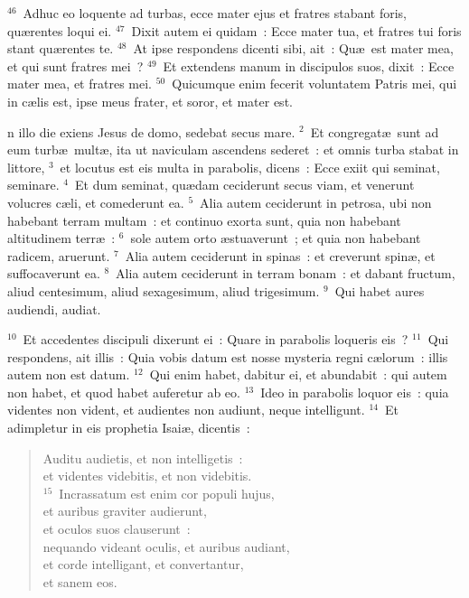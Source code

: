 ${}^{46}$~Adhuc eo loquente ad turbas, ecce mater ejus et fratres stabant foris, qu\ae rentes loqui ei.
${}^{47}$~Dixit autem ei quidam~: Ecce mater tua, et fratres tui foris stant qu\ae rentes te.
${}^{48}$~At ipse respondens dicenti sibi, ait~: Qu\ae\ est mater mea, et qui sunt fratres mei~?
${}^{49}$~Et extendens manum in discipulos suos, dixit~: Ecce mater mea, et fratres mei.
${}^{50}$~Quicumque enim fecerit voluntatem Patris mei, qui in c\ae lis est, ipse meus frater, et soror, et mater est.

\bchapter
{}n illo die exiens Jesus de domo, sedebat secus mare.
${}^{2}$~Et congregat\ae\ sunt ad eum turb\ae\ mult\ae , ita ut naviculam ascendens sederet~: et omnis turba stabat in littore,
${}^{3}$~et locutus est eis multa in parabolis, dicens~: Ecce exiit qui seminat, seminare.
${}^{4}$~Et dum seminat, qu\ae dam ceciderunt secus viam, et venerunt volucres c\ae li, et comederunt ea.
${}^{5}$~Alia autem ceciderunt in petrosa, ubi non habebant terram multam~: et continuo exorta sunt, quia non habebant altitudinem terr\ae~:
${}^{6}$~sole autem orto \ae stuaverunt~; et quia non habebant radicem, aruerunt.
${}^{7}$~Alia autem ceciderunt in spinas~: et creverunt spin\ae , et suffocaverunt ea.
${}^{8}$~Alia autem ceciderunt in terram bonam~: et dabant fructum, aliud centesimum, aliud sexagesimum, aliud trigesimum.
${}^{9}$~Qui habet aures audiendi, audiat.


${}^{10}$~Et accedentes discipuli dixerunt ei~: Quare in parabolis loqueris eis~?
${}^{11}$~Qui respondens, ait illis~: Quia vobis datum est nosse mysteria regni c\ae lorum~: illis autem non est datum.
${}^{12}$~Qui enim habet, dabitur ei, et abundabit~: qui autem non habet, et quod habet auferetur ab eo.
${}^{13}$~Ideo in parabolis loquor eis~: quia videntes non vident, et audientes non audiunt, neque intelligunt.
${}^{14}$~Et adimpletur in eis prophetia Isai\ae , dicentis~: \begin{verse}Auditu audietis, et non intelligetis~:\\ et videntes videbitis, et non videbitis.\\
${}^{15}$~Incrassatum est enim cor populi hujus,\\ et auribus graviter audierunt,\\ et oculos suos clauserunt~:\\ nequando videant oculis, et auribus audiant,\\ et corde intelligant, et convertantur,\\ et sanem eos.\end{verse}


